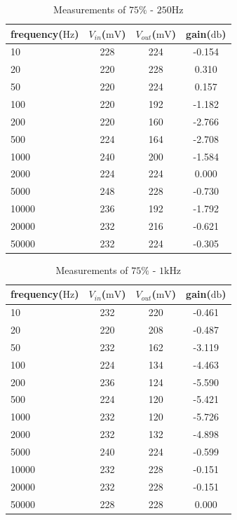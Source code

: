 \begin{table}[!htbp]
	\centering
	\caption{Measurements of $75\%$ - $250\si{\hertz}$}
	\label{tab:data20}
	\begin{tabular}{lccc}
		\toprule
		frequency($\si{\hertz}$) & $V_{in}$($\si{\milli\volt}$) & $V_{out}$($\si{\milli\volt}$) & gain($\si{\decibel}$) \\
		\midrule
		10&	228&	224&	-0.154\\
		20&	220&	228&	0.310\\
		50&	220&	224&	0.157\\
		100&	220&	192&	-1.182\\
		200&	220&	160&	-2.766\\
		500&	224&	164&	-2.708\\
		1000&	240&	200&	-1.584\\
		2000&	224&	224&	0.000\\
		5000&	248&	228&	-0.730\\
		10000&	236&	192&	-1.792\\
		20000&	232&	216&	-0.621\\
		50000&	232&	224&	-0.305\\
		
		\bottomrule
	\end{tabular}
\end{table}

\begin{table}[!htbp]
	\centering
	\caption{Measurements of $75\%$ - $1\si{\kilo\hertz}$}
	\label{tab:data21}
	\begin{tabular}{lccc}
		\toprule
		frequency($\si{\hertz}$) & $V_{in}$($\si{\milli\volt}$) & $V_{out}$($\si{\milli\volt}$) & gain($\si{\decibel}$) \\
		\midrule
		10&	232&	220&	-0.461\\
		20&	220&	208&	-0.487\\
		50&	232&	162&	-3.119\\
		100&	224&	134&	-4.463\\
		200&	236&	124&	-5.590\\
		500&	224&	120&	-5.421\\
		1000&	232&	120&	-5.726\\
		2000&	232&	132&	-4.898\\
		5000&	240&	224&	-0.599\\
		10000&	232&	228&	-0.151\\
		20000&	232&	228&	-0.151\\
		50000&	228&	228&	0.000\\
		\bottomrule
	\end{tabular}
\end{table}

